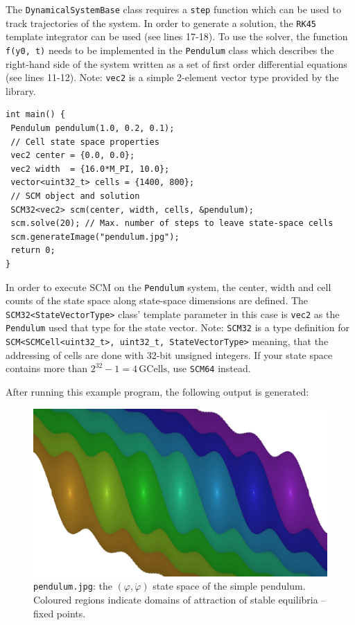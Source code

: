 \documentclass[11pt]{article}
\begin{document}
The \texttt{DynamicalSystemBase} class requires a \texttt{step} function which can be used to track trajectories of the system. In order to generate a solution, the \texttt{RK45} template integrator can be used (see lines 17-18). To use the solver,  the function \texttt{f(y0, t)} needs to be implemented in the \texttt{Pendulum} class which describes the right-hand side of the system written as a set of first order differential equations (see lines 11-12). Note: \texttt{vec2} is a simple 2-element vector type provided by the library.

\begin{lstlisting}
int main() {
 Pendulum pendulum(1.0, 0.2, 0.1);
 // Cell state space properties
 vec2 center = {0.0, 0.0};
 vec2 width  = {16.0*M_PI, 10.0};
 vector<uint32_t> cells = {1400, 800};
 // SCM object and solution
 SCM32<vec2> scm(center, width, cells, &pendulum);
 scm.solve(20); // Max. number of steps to leave state-space cells
 scm.generateImage("pendulum.jpg");
 return 0;
}
\end{lstlisting}
In order to execute SCM on the \texttt{Pendulum} system, the center, width and cell counts of the state space along state-space dimensions are defined. The \texttt{SCM32<StateVectorType>} class' template parameter in this case is \texttt{vec2} as the \texttt{Pendulum} used that type for the state vector. Note: \texttt{SCM32} is a type definition for \texttt{SCM<SCMCell<uint32\_t>, uint32\_t, StateVectorType>} meaning, that the addressing of cells are done with 32-bit unsigned integers. If your state space contains more than $2^{32}-1 = 4\,\mathrm{GCells}$, use \texttt{SCM64} instead.

\newpage

After running this example program, the following output is generated:

\begin{figure}[h]
	\centering
	\includegraphics[width=14cm]{fig/pendulum.jpg}
	\caption{\texttt{pendulum.jpg}: the $(\varphi, \dot\varphi)$ state space of the simple pendulum. Coloured regions indicate domains of attraction of stable equilibria -- fixed points.}
\end{figure}
\end{document}
